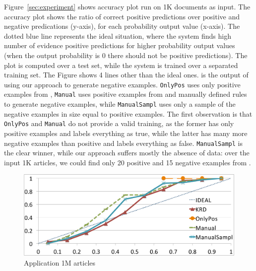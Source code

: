 Figure~\ref{sec:experiment} shows \deepdive accuracy plot run on 1K documents as input. The accuracy plot shows the ratio of correct positive predictions over positive and negative predications (y-axis), for each probability output value (x-axis). The dotted blue line represents the ideal situation, where the system finds high number of evidence positive predictions for higher probability output values (when the output probability is 0 there should not be positive predictions). The plot is computed over a test set, while the system is trained over a separated training set. The Figure shows 4 lines other than the ideal ones. \sys is the output of \deepdive using our approach to generate negative examples. \texttt{OnlyPos} uses only positive examples from \dbpedia, \texttt{Manual} uses positive examples from \dbpedia and manually defined rules to generate negative examples, while \texttt{ManualSampl} uses only a sample of the negative examples in size equal to positive examples. The first observation is that \texttt{OnlyPos} and \texttt{Manual} do not provide a valid training, as the former has only positive examples and labels everything as true, while the latter has many more negative examples than positive and labels everything as false. \texttt{ManualSampl} is the clear winner, while our approach suffers mostly the absence of data: over the input 1K articles, we could find only 20 positive and 15 negative examples from \dbpedia.

\begin{figure}[b]
	\centering
	\includegraphics[width=\columnwidth]{include/figure/deepDive1M.pdf}
	\caption{\deepdive Application 1M articles}
	\label{fig:deep_dive_1M}
\end{figure}


